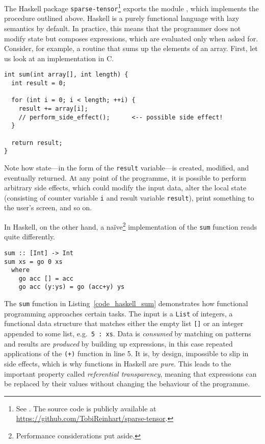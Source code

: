 The Haskell package \texttt{sparse-tensor}\footnote{See \cite{Reinhart_2019_sparse-tensor}. The source code is publicly available at \url{https://github.com/TobiReinhart/sparse-tensor}.} exports the module \texttt{}, which implements the procedure outlined above. Haskell is a purely functional language with lazy semantics by default. \cite{Marlow_2010} In practice, this means that the programmer does not modify state but composes expressions, which are evaluated only when asked for. Consider, for example, a routine that sums up the elements of an array. First, let us look at an implementation in C.
\begin{code}
  \begin{verbatim}
int sum(int array[], int length) {
  int result = 0;

  for (int i = 0; i < length; ++i) {
    result += array[i];
    // perform_side_effect();      <-- possible side effect!
  }

  return result;
}
  \end{verbatim}
\end{code}
Note how state---in the form of the \texttt{result} variable---is created, modified, and eventually returned. At any point of the programme, it is possible to perform arbitrary side effects, which could modify the input data, alter the local state (consisting of counter variable \texttt{i} and result variable \texttt{result}), print something to the user's screen, and so on.

In Haskell, on the other hand, a na\"ive\footnote{Performance considerations put aside.} implementation of the \texttt{sum} function reads quite differently.
\begin{code}
  \begin{verbatim}
sum :: [Int] -> Int
sum xs = go 0 xs
  where
    go acc [] = acc
    go acc (y:ys) = go (acc+y) ys
  \end{verbatim}
  \label{code_haskell_sum}
\end{code}
The \texttt{sum} function in Listing~\ref{code_haskell_sum} demonstrates how functional programming approaches certain tasks. The input is a \texttt{List} of integers, a functional data structure that matches either the empty list \texttt{[]} or an integer appended to some list, e.g.\ \texttt{5 : xs}. Data is \emph{consumed} by matching on patterns and results are \emph{produced} by building up expressions, in this case repeated applications of the \texttt{(+)} function in line 5. It is, by design, impossible to slip in side effects, which is why functions in Haskell are \emph{pure}. This leads to the important property called \emph{referential transparency}, meaning that expressions can be replaced by their values without changing the behaviour of the programme.

